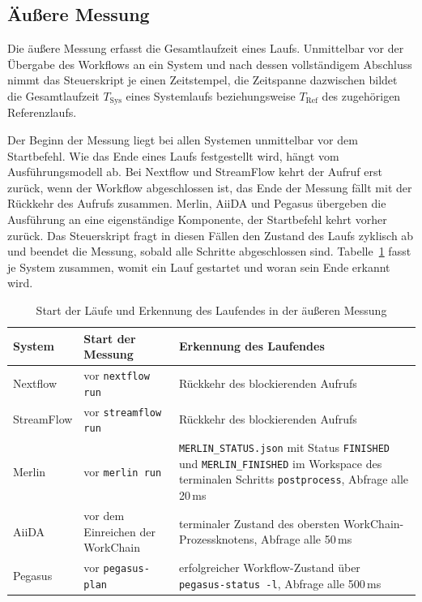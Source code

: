 \subsection{Äußere Messung}
\label{sec:methodik:aussen}

Die äußere Messung erfasst die Gesamtlaufzeit eines Laufs.
Unmittelbar vor der Übergabe des Workflows an ein System und nach
dessen vollständigem Abschluss nimmt das Steuerskript je einen
Zeitstempel, die Zeitspanne dazwischen bildet die Gesamtlaufzeit
$T_{\mathrm{Sys}}$ eines Systemlaufs beziehungsweise
$T_{\mathrm{Ref}}$ des zugehörigen Referenzlaufs.

Der Beginn der Messung liegt bei allen Systemen unmittelbar vor dem
Startbefehl. Wie das Ende eines Laufs festgestellt wird, hängt vom
Ausführungsmodell ab. Bei Nextflow und StreamFlow kehrt der Aufruf
erst zurück, wenn der Workflow abgeschlossen ist, das Ende der
Messung fällt mit der Rückkehr des Aufrufs zusammen. Merlin, AiiDA
und Pegasus übergeben die Ausführung an eine eigenständige
Komponente, der Startbefehl kehrt vorher zurück. Das Steuerskript
fragt in diesen Fällen den Zustand des Laufs zyklisch ab und
beendet die Messung, sobald alle Schritte abgeschlossen sind.
Tabelle~\ref{tab:methodik:endeerkennung} fasst je System zusammen,
womit ein Lauf gestartet und woran sein Ende erkannt wird.

\begin{table}[H]
  \caption{Start der Läufe und Erkennung des Laufendes in der äußeren Messung}
  \label{tab:methodik:endeerkennung}
  \centering
  \small
  \renewcommand{\arraystretch}{1.3}
  \begin{tabular}{l l p{6.4cm}}
    \hline
    \textbf{System} & \textbf{Start der Messung} & \textbf{Erkennung des Laufendes} \\
    \hline
    Nextflow
    & vor \texttt{nextflow run}
    & Rückkehr des blockierenden Aufrufs \\

    StreamFlow
    & vor \texttt{streamflow run}
    & Rückkehr des blockierenden Aufrufs \\

    Merlin
    & vor \texttt{merlin run}
    & \texttt{MERLIN\_STATUS.json} mit Status \texttt{FINISHED} und
      \texttt{MERLIN\_FINISHED} im Workspace des terminalen Schritts
      \texttt{postprocess}, Abfrage alle 20\,ms \\

    AiiDA
    & vor dem Einreichen der WorkChain
    & terminaler Zustand des obersten WorkChain-Prozessknotens,
      Abfrage alle 50\,ms \\

    Pegasus
    & vor \texttt{pegasus-plan}
    & erfolgreicher Workflow-Zustand über
      \texttt{pegasus-status -l}, Abfrage alle 500\,ms \\
    \hline
  \end{tabular}
\end{table}

